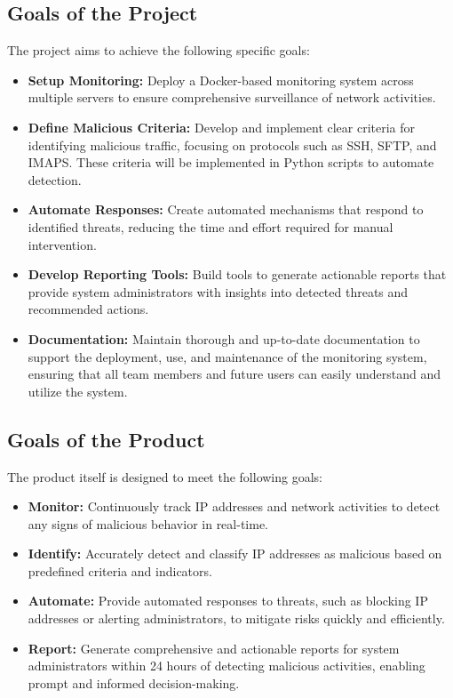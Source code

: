 \documentclass[11pt,a4paper]{article}
\begin{document}
    \subsection{Goals of the Project}\label{subsec:goals-of-the-project}
    The project aims to achieve the following specific goals:
    \begin{itemize}
        \item \textbf{Setup Monitoring:} Deploy a Docker-based monitoring system across multiple servers to ensure comprehensive surveillance of network activities.
        \item \textbf{Define Malicious Criteria:} Develop and implement clear criteria for identifying malicious traffic, focusing on protocols such as SSH, SFTP, and IMAPS. These criteria will be implemented in Python scripts to automate detection.
        \item \textbf{Automate Responses:} Create automated mechanisms that respond to identified threats, reducing the time and effort required for manual intervention.
        \item \textbf{Develop Reporting Tools:} Build tools to generate actionable reports that provide system administrators with insights into detected threats and recommended actions.
        \item \textbf{Documentation:} Maintain thorough and up-to-date documentation to support the deployment, use, and maintenance of the monitoring system, ensuring that all team members and future users can easily understand and utilize the system.
    \end{itemize}

    \subsection{Goals of the Product}\label{subsec:goals-of-the-product}
    The product itself is designed to meet the following goals:
    \begin{itemize}
        \item \textbf{Monitor:} Continuously track IP addresses and network activities to detect any signs of malicious behavior in real-time.
        \item \textbf{Identify:} Accurately detect and classify IP addresses as malicious based on predefined criteria and indicators.
        \item \textbf{Automate:} Provide automated responses to threats, such as blocking IP addresses or alerting administrators, to mitigate risks quickly and efficiently.
        \item \textbf{Report:} Generate comprehensive and actionable reports for system administrators within 24 hours of detecting malicious activities, enabling prompt and informed decision-making.
    \end{itemize}
\end{document}
